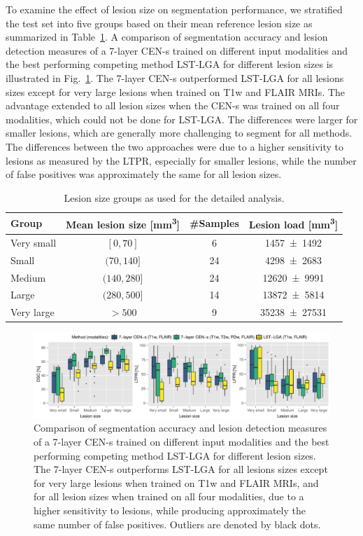 To examine the effect of lesion size on segmentation performance, we stratified
the test set into five groups based on their mean reference lesion size as
summarized in Table~\ref{tab:groups}. A comparison of segmentation accuracy and
lesion detection measures of a 7-layer CEN-s trained on different input
modalities and the best performing competing method LST-LGA for different lesion
sizes is illustrated in Fig.~\ref{fig:sizecomp}. The 7-layer CEN-s outperformed
LST-LGA for all lesions sizes except for very large lesions when trained on T1w
and FLAIR MRIs. The advantage extended to all lesion sizes when the \mbox{CEN-s} was
trained on all four modalities, which could not be done for LST-LGA.
The differences were larger for smaller lesions, which are generally more
challenging to segment for all methods. The differences between the two
approaches were due to a higher sensitivity to lesions as measured by the
LTPR, especially for smaller lesions, while the number of false positives
was approximately the same for all lesion sizes.

\begin{table}[tb]
\caption{Lesion size groups as used for the detailed analysis.}
\label{tab:groups}
\centering
\begin{tabular}{@{}lccc@{}}
\toprule
Group & Mean lesion size [\si{\cubic\milli\metre}] & \#Samples & Lesion
load [\si{\cubic\milli\metre}] \\
\midrule
Very small & $[0,70]$ & 6 & \num{1457+-1492} \\
Small      & $(70,140]$ & 24 & \num{4298+-2683} \\
Medium & $(140,280]$ & 24 & \num{12620+-9991} \\
Large & $(280,500]$ & 14 & \num{13872+-5814} \\
Very large & $> 500$ & 9 & \num{35238+-27531} \\
\bottomrule
\end{tabular}
\end{table}

\begin{figure}
\centering
\includegraphics[width=\textwidth]{figures/tmi/cen_vs_LGA_size}

\caption{Comparison of segmentation accuracy and lesion detection measures of a
7-layer CEN-s trained on different input modalities and the best performing
competing method LST-LGA for different lesion sizes. The 7-layer CEN-s
outperforms LST-LGA for all lesions sizes except for very large lesions when
trained on T1w and FLAIR MRIs, and for all lesion sizes when trained on all four
modalities, due to a higher sensitivity to lesions, while producing
approximately the same number of false positives. Outliers are denoted by black
dots.}

\label{fig:sizecomp}
\end{figure}

